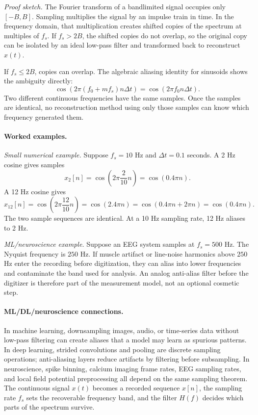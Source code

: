 \emph{Proof sketch.}
The Fourier transform of a bandlimited signal occupies only \([-B,B]\). Sampling multiplies the signal by an impulse train in time. In the frequency domain, that multiplication creates shifted copies of the spectrum at multiples of \(f_s\). If \(f_s>2B\), the shifted copies do not overlap, so the original copy can be isolated by an ideal low-pass filter and transformed back to reconstruct \(x(t)\).

If \(f_s\leq 2B\), copies can overlap. The algebraic aliasing identity for sinusoids shows the ambiguity directly:
\[
\cos\left(2\pi (f_0+mf_s)n\Delta t\right)
=
\cos\left(2\pi f_0 n\Delta t\right).
\]
Two different continuous frequencies have the same samples. Once the samples are identical, no reconstruction method using only those samples can know which frequency generated them.

\paragraph{Worked examples.}
\emph{Small numerical example.} Suppose \(f_s=10\) Hz and \(\Delta t=0.1\) seconds. A 2 Hz cosine gives samples
\[
x_2[n]=\cos\left(2\pi\frac{2}{10}n\right)
=\cos(0.4\pi n).
\]
A 12 Hz cosine gives
\[
x_{12}[n]=\cos\left(2\pi\frac{12}{10}n\right)
=\cos(2.4\pi n)
=\cos(0.4\pi n+2\pi n)
=\cos(0.4\pi n).
\]
The two sample sequences are identical. At a 10 Hz sampling rate, 12 Hz aliases to 2 Hz.

\emph{ML/neuroscience example.} Suppose an EEG system samples at \(f_s=500\) Hz. The Nyquist frequency is \(250\) Hz. If muscle artifact or line-noise harmonics above \(250\) Hz enter the recording before digitization, they can alias into lower frequencies and contaminate the band used for analysis. An analog anti-alias filter before the digitizer is therefore part of the measurement model, not an optional cosmetic step.

\paragraph{ML/DL/neuroscience connections.}
In machine learning, downsampling images, audio, or time-series data without low-pass filtering can create aliases that a model may learn as spurious patterns. In deep learning, strided convolutions and pooling are discrete sampling operations; anti-aliasing layers reduce artifacts by filtering before subsampling. In neuroscience, spike binning, calcium imaging frame rates, EEG sampling rates, and local field potential preprocessing all depend on the same sampling theorem. The continuous signal \(x(t)\) becomes a recorded sequence \(x[n]\), the sampling rate \(f_s\) sets the recoverable frequency band, and the filter \(H(f)\) decides which parts of the spectrum survive.

